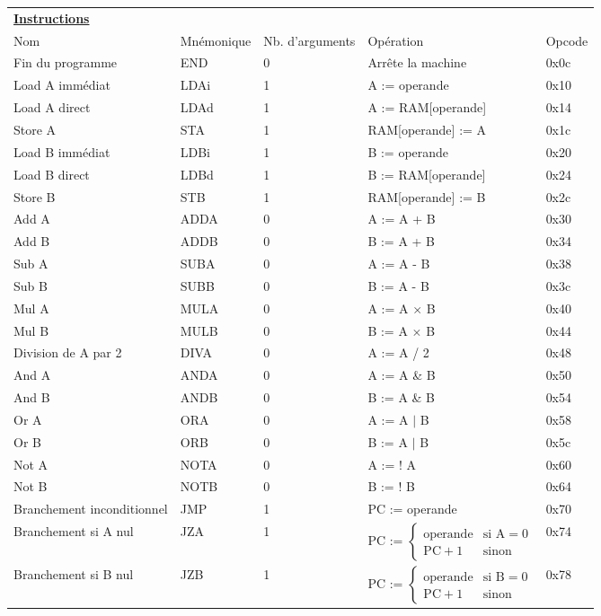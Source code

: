 \documentclass{standalone}
\begin{document}
\renewcommand{\arraystretch}{1.2}
\begin{tabular}{@{}lllll@{}}
\textbf{\underline{Instructions}} & & & & \\
\addlinespace[1em]
\toprule
Nom & Mnémonique & Nb. d'arguments & Opération & Opcode \\
\toprule
Fin du programme & END & 0 & Arrête la machine & 0x0c\\
Load A immédiat & LDAi & 1 & A := operande & 0x10 \\
Load A direct & LDAd & 1 & A := RAM[operande] & 0x14 \\
Store A  & STA & 1 & RAM[operande] := A & 0x1c\\
\addlinespace[1em]
Load B immédiat & LDBi & 1 & B := operande & 0x20 \\
Load B direct & LDBd & 1 & B := RAM[operande] & 0x24 \\
Store B  & STB & 1 & RAM[operande] := B & 0x2c\\
\addlinespace[1em]
Add A & ADDA & 0 & A := A + B & 0x30 \\
Add B & ADDB & 0 & B := A + B & 0x34 \\
Sub A & SUBA & 0 & A := A - B & 0x38 \\
Sub B & SUBB & 0 & B := A - B & 0x3c \\
Mul A & MULA & 0 & A := A $\times$ B & 0x40 \\
Mul B & MULB & 0 & B := A $\times$ B & 0x44 \\
Division de A par 2 & DIVA & 0 & A := A / 2 & 0x48 \\
\addlinespace[1em]
And A & ANDA & 0 & A := A \& B & 0x50 \\
And B & ANDB & 0 & B := A \& B & 0x54 \\
Or A & ORA & 0 & A := A $\mid$ B & 0x58 \\
Or B & ORB & 0 & B := A $\mid$ B & 0x5c \\
Not A & NOTA & 0 & A := ! A & 0x60 \\
Not B & NOTB & 0 & B := ! B & 0x64 \\
\addlinespace[1em]
Branchement inconditionnel & JMP & 1 & PC := operande & 0x70\\
Branchement si A nul & JZA & 1 & PC := $\left\{\begin{array}{ll}\text{operande} & \text{si A} = 0 \\\text{PC} + 1 & \text{sinon}\end{array}\right.$& 0x74\\
Branchement si B nul & JZB & 1 & PC := $\left\{\begin{array}{ll}\text{operande} & \text{si B} = 0 \\\text{PC} + 1 & \text{sinon}\end{array}\right.$& 0x78
\end{tabular}
\end{document}
